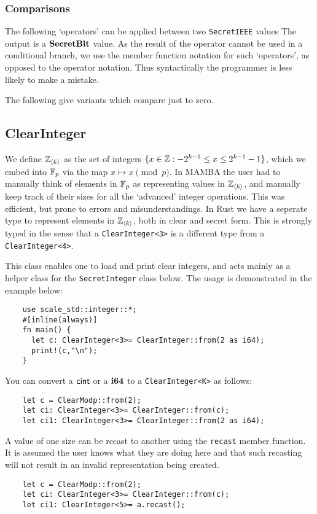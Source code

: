 \subsubsection{Comparisons}
The following `operators' can be applied between two \verb|SecretIEEE| values
The output is a $\mathbf{SecretBit}$ value.
As the result of the operator cannot be used in a conditional branch,
we use the member function notation for such `operators', as opposed
to the operator notation. Thus syntactically the programmer is less
likely to make a mistake.

\noindent
The following give variants which compare just to zero.


\subsection{ClearInteger}
We define ${\mathbb{Z}}_{\langle k \rangle}$ as the set of integers $\{x \in {\mathbb{Z}}: -2^{k-1} \le x \le 2^{k-1}-1\}$,
which we embed into ${\mathbb{F}}_p$ via the map $x \mapsto x \pmod{p}$.
In MAMBA the user had to manually think of elements in ${\mathbb{F}}_p$
as representing values in ${\mathbb{Z}}_{\langle k \rangle}$, and manually keep track of their
sizes for all the `advanced' integer operations.
This was efficient, but prone to errors and misunderstandings.
In Rust we have a seperate type to represent elements in ${\mathbb{Z}}_{\langle k \rangle}$,
both in clear and secret form.
This is strongly typed in the sense that a
\verb|ClearInteger<3>|  is a different type from a
\verb|ClearInteger<4>|.

This class enables one to load and print clear integers, and acts
mainly as a helper class for the \verb|SecretInteger| class below.
The usage is demonstrated in the example below:
\begin{lstlisting}
    use scale_std::integer::*;
    #[inline(always)]
    fn main() {
      let c: ClearInteger<3>= ClearInteger::from(2 as i64);
      print!(c,"\n");
    }
\end{lstlisting}

You can convert a $\mathsf{cint}$ or a $\mathbf{i64}$ to a \verb|ClearInteger<K>| as follows:
\begin{lstlisting}
    let c = ClearModp::from(2);
    let ci: ClearInteger<3>= ClearInteger::from(c);
    let ci1: ClearInteger<3>= ClearInteger::from(2 as i64);
\end{lstlisting}

A value of one size can be recast to another using the \verb|recast|
member function. It is assumed the user knows what they are doing here
and that such recasting will not result in an invalid representation
being created.
\begin{lstlisting}
    let c = ClearModp::from(2);
    let ci: ClearInteger<3>= ClearInteger::from(c);
    let ci1: ClearInteger<5>= a.recast();
\end{lstlisting}

